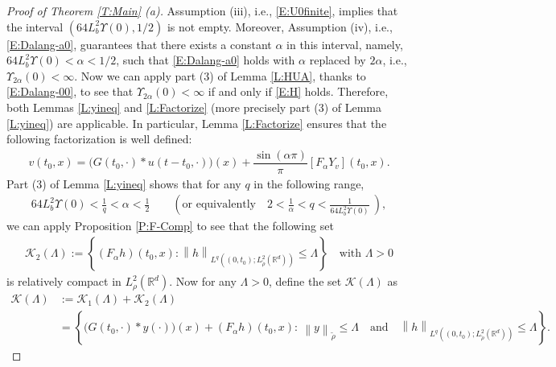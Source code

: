 \documentclass[12pt]{report}
\theoremstyle{plain}
\theoremstyle{definition}
\numberwithin{equation}{section}
\newcommand{\R}{\mathbb{R}}
\newcommand{\Norm}[1]{\left\|  #1   \right\|}
\begin{document}
\begin{proof}[Proof of Theorem \ref{T:Main} (a)]
	Assumption (iii), i.e., \eqref{E:U0finite}, implies that the interval $\left(64L_b^2 \Upsilon(0),
	1/2\right)$ is not empty. Moreover, Assumption (iv), i.e., \eqref{E:Dalang-a0}, guarantees that
	there exists a constant $\alpha$ in this interval, namely, $64L_b^2\Upsilon(0) <\alpha<1/2$, such
	that \eqref{E:Dalang-a0} holds with $\alpha$ replaced by $2\alpha$, i.e.,
	$\Upsilon_{2\alpha}(0)<\infty$. Now we can apply part (3) of Lemma \ref{L:HUA}, thanks to
	\eqref{E:Dalang-00}, to see that $\Upsilon_{2\alpha}(0)<\infty$ if and only
	if \eqref{E:H} holds. Therefore, both Lemmas \ref{L:yineq} and \ref{L:Factorize} (more precisely part (3) of Lemma \ref{L:yineq}) are applicable. In particular, Lemma \ref{L:Factorize} ensures that the following
	factorization is well defined:
	\begin{align} \label{E:Fact}
	v(t_0,x) = \Big(G(t_0,\cdot) * u(t-t_0,\cdot)\Big)(x) +\dfrac{\sin(\alpha \pi)}{\pi} \left[F_\alpha Y_v\right](t_0,x).
	\end{align}
	Part (3) of Lemma \ref{L:yineq} shows that for any $q$ in the following range,
	\begin{align} \label{E:Choice}
	64 L_b^2 \Upsilon(0) < \frac{1}{q} < \alpha <\frac{1}{2}
	\qquad \left(\text{or equivalently} \quad
	2< \frac{1}{\alpha} < q < \frac{1}{64 L_b^2 \Upsilon(0)}\:\right),
	\end{align}
	we can apply Proposition \ref{P:F-Comp} to see that the following set
	\begin{align*}
	\mathscr{K}_2 (\Lambda):=
	\left\{(F_\alpha h)(t_0,x): \Norm{h}_{L^q\left((0,t_0);L^2_{\tilde{\rho}}\left(\R^d\right)\right)} \le \Lambda \right\}
	\quad \text{with $\Lambda>0$}
	\end{align*}
	is relatively compact in $L_\rho^2(\R^d)$. Now for any $\Lambda>0$, define the set $\mathscr{K}
	(\Lambda)$ as
	\begin{align*}
	\mathscr{K} (\Lambda)
	& :=\mathscr{K}_1 (\Lambda) + \mathscr{K}_2 (\Lambda) \\
	& = \left\{ \big(G(t_0,\cdot)*y(\cdot)\big)(x)+(F_\alpha h)(t_0, x): \:\Norm{y}_{\tilde{\rho}}
	\le \Lambda \quad \text{and}\quad\Norm{h}_{L^q\left((0,t_0);L^2_{\tilde{\rho}}\left(\R^d\right)\right)} \le \Lambda \right\}.
	\end{align*}
	

\end{proof}
\end{document}
